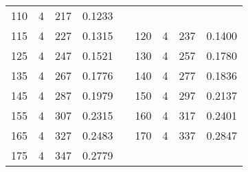 \documentclass[a4paper, 12pt, french,oneside]{book}
\begin{document}
\begin{table}[!ht]
\begin{tabularx}{\linewidth}{|c|c|c|c|X|c|c|c|c|}
        110          & 4            & 217             & 0.1233                                                                                                           \\

        115          & 4            & 227             & 0.1315                        &  &

        120          & 4            & 237             & 0.1400                                                                                                           \\

        125          & 4            & 247             & 0.1521                        &  &

        130          & 4            & 257             & 0.1780                                                                                                           \\

        135          & 4            & 267             & 0.1776                        &  &

        140          & 4            & 277             & 0.1836                                                                                                           \\

        145          & 4            & 287             & 0.1979                        &  &

        150          & 4            & 297             & 0.2137                                                                                                           \\

        155          & 4            & 307             & 0.2315                        &  &

        160          & 4            & 317             & 0.2401                                                                                                           \\

        165          & 4            & 327             & 0.2483                        &  &

        170          & 4            & 337             & 0.2847                                                                                                           \\

        175          & 4            & 347             & 0.2779                        &  &


\end{tabularx}
\end{table}
\end{document}
